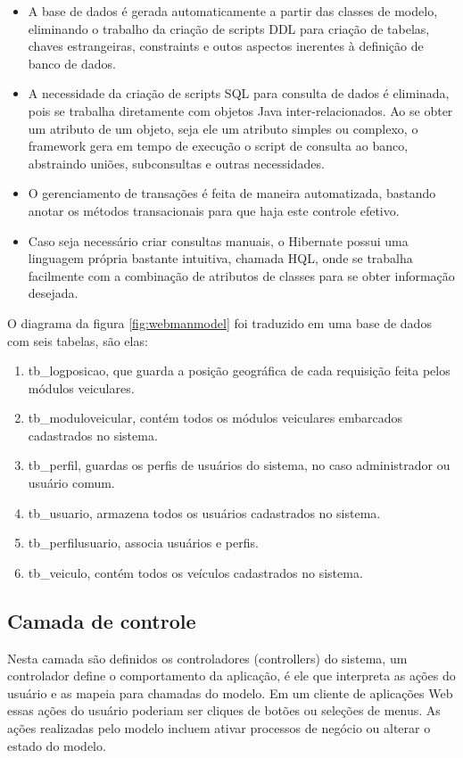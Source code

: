 \begin{itemize}
	\item A base de dados é gerada automaticamente a partir das classes de modelo, eliminando o trabalho da criação de scripts DDL para criação de tabelas, chaves estrangeiras, constraints e outos aspectos inerentes à definição de banco de dados.
	\item A necessidade da criação de scripts SQL para consulta de dados é eliminada, pois se trabalha diretamente com objetos Java inter-relacionados. Ao se obter um atributo de um objeto, seja ele um atributo simples ou complexo, o framework gera em tempo de execução o script de consulta ao banco, abstraindo uniões, subconsultas e outras necessidades.
	\item O gerenciamento de transações é feita de maneira automatizada, bastando anotar os métodos transacionais para que haja este controle efetivo.
	\item Caso seja necessário criar consultas manuais, o Hibernate possui uma linguagem própria bastante intuitiva, chamada HQL, onde se trabalha facilmente com a combinação de atributos de classes para se obter informação desejada. 
\end{itemize}

O diagrama da figura \ref{fig:webmanmodel} foi traduzido em uma base de dados com seis tabelas, são elas:

\begin{enumerate}
	\item tb\_logposicao, que guarda a posição geográfica de cada requisição feita pelos módulos veiculares.
	\item tb\_moduloveicular, contém todos os módulos veiculares embarcados cadastrados no sistema.
	\item tb\_perfil, guardas os perfis de usuários do sistema, no caso administrador ou usuário comum.
	\item tb\_usuario, armazena todos os usuários cadastrados no sistema.
	\item tb\_perfilusuario, associa usuários e perfis.
	\item tb\_veiculo, contém todos os veículos cadastrados no sistema.
\end{enumerate}

\subsection{Camada de controle}

Nesta camada são definidos os controladores (controllers) do sistema, um controlador define o comportamento da aplicação, é ele que interpreta as ações do usuário e as mapeia para chamadas do modelo. Em um cliente de aplicações Web essas ações do usuário poderiam ser cliques de botões ou seleções de menus. As ações realizadas pelo modelo incluem ativar processos de negócio ou alterar o estado do modelo.

